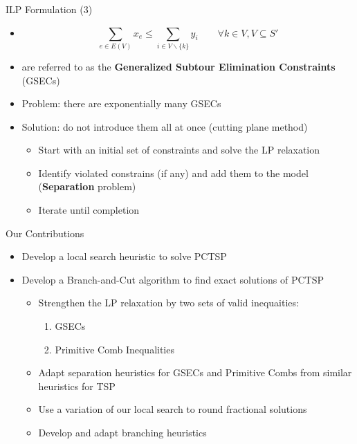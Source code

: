 \begin{frame}[t]{ILP Formulation (3)}
    \begin{itemize}
        \item<1->[ ]
        \[  \sum_{e \in E(V) } x_e \leq \sum_{i \in V \backslash\{ k \}} y_{i} \qquad \forall k \in V, V\subseteq S' \]
        \item<2->  are referred to as the \textbf{Generalized Subtour Elimination Constraints} (GSECs) 
        \item<3-> Problem: there are exponentially many GSECs
        \item<4-> Solution: do not introduce them all at once (cutting plane method)
            \begin{itemize}
                \item<5-> Start with an initial set of constraints and solve the LP relaxation
                \item<6-> Identify violated constrains (if any) and add them to the model (\textbf{Separation} problem)
                \item<7-> Iterate until completion
            \end{itemize}    
    \end{itemize}
\end{frame}

\begin{frame}[t]{Our Contributions}
    \begin{itemize}
        \item<1-> Develop a \alert{local search} heuristic to solve PCTSP
        \item<2-> Develop a \alert{Branch-and-Cut} algorithm to find exact solutions of PCTSP
            \begin{itemize}
                \item<3-> Strengthen the LP relaxation by two sets of valid inequaities:
                    \begin{enumerate}
                        \item<4-> GSECs
                        \item<5-> Primitive Comb Inequalities
                    \end{enumerate}
                \item<6-> Adapt \alert{separation heuristics} for GSECs and Primitive Combs from similar heuristics for TSP
                \item<7-> Use a variation of our local search to \alert{round} fractional solutions
                \item<8-> Develop and adapt \alert{branching heuristics}
            \end{itemize}
    \end{itemize}
\end{frame}

